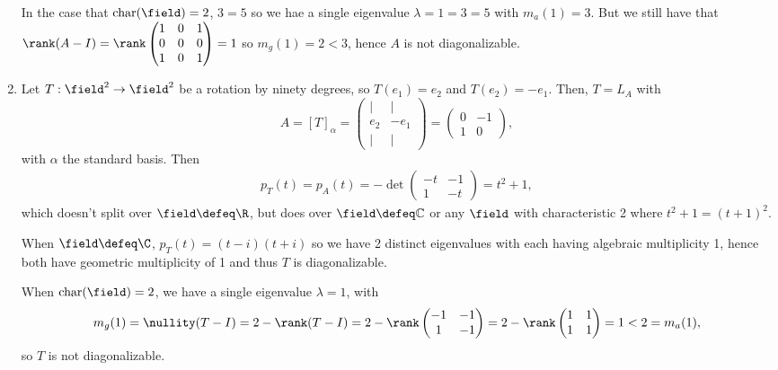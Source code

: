 \begin{example}
\begin{enumerate}
        In the case that $\text{char}(\field) = 2$, $3 = 5$ so we hae a single eigenvalue $\lambda = 1 = 3 = 5$ with $m_a(1) = 3$. But we still have that $\rank(A - I) = \rank \begin{pmatrix}
            1& 0 & 1\\
            0 & 0 & 0\\
            1 & 0 & 1
        \end{pmatrix} = 1$ so $m_g(1) = 2 < 3$, hence $A$ is not diagonalizable.

        \item Let $T : \field^2 \to \field^2$ be a rotation by ninety degrees, so $T(e_1) = e_2$ and $T(e_2) = - e_1$. Then, $T = L_A$ with \[
        A = [T]_\alpha = \begin{pmatrix}
            \vert & \vert\\
            e_2 & -e_1\\
            \vert & \vert
        \end{pmatrix}    = \begin{pmatrix}
            0 & - 1\\
            1 & 0
        \end{pmatrix},
        \]
        with $\alpha$ the standard basis. Then \begin{align*}
            p_T(t) = p_A(t) = -\det \begin{pmatrix}
                -t & -1 \\
                1 & -t
            \end{pmatrix} = t^2 + 1,
        \end{align*}
        which doesn't split over $\field\defeq\R$, but does over $\field\defeq\mathbb{C}$ or any $\field$ with characteristic 2 where $t^2 + 1 = (t+1)^2$.

        When $\field \defeq \C$, $p_T(t) = (t - i)(t + i)$ so we have 2 distinct eigenvalues with each having algebraic multiplicity 1, hence both have geometric multiplicity of 1 and thus $T$ is diagonalizable.

        When $\text{char}(\field) = 2$, we have a single eigenvalue $\lambda = 1$, with \begin{align*}
            m_g(1) = \nullity(T - I) =  2 - \rank(T - I) = 2 - \rank\begin{pmatrix}
                -1 & -1 \\
                1 &  -1
            \end{pmatrix} = 2 - \rank \begin{pmatrix}
                1 & 1\\
                1 & 1
            \end{pmatrix} = 1 < 2 = m_a(1),
        \end{align*}
        so $T$ is not diagonalizable.
    \end{enumerate}
\end{example}


